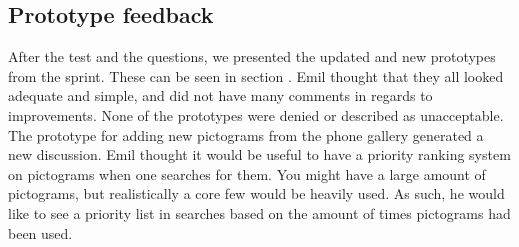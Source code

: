\subsection{Prototype feedback}
After the test and the questions, we presented the updated and new prototypes from the sprint.
These can be seen in section .
Emil thought that they all looked adequate and simple, and did not have many comments in regards to improvements.
None of the prototypes were denied or described as unacceptable.
The prototype for adding new pictograms from the phone gallery generated a new discussion.
Emil thought it would be useful to have a priority ranking system on pictograms when one searches for them.
You might have a large amount of pictograms, but realistically a core few would be heavily used.
As such, he would like to see a priority list in searches based on the amount of times pictograms had been used.
